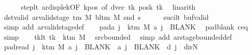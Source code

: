 \begin{isabellebody}
\ \ \ \ \isamarkupfalse%
\ step{\isacharunderscore}{\kern0pt}lt\ ar{\isacharunderscore}{\kern0pt}disp{\isacharunderscore}{\kern0pt}le{\isacharunderscore}{\kern0pt}{}k{\isacharbrackleft}{\kern0pt}OF\ kpos{\isacharcomma}{\kern0pt}\ of\ {\isachardoublequoteopen}dvec\ tk{\isachardoublequoteclose}\ {\isachardoublequoteopen}posk\ tk{\isachardoublequoteclose}{\isacharbrackright}{\kern0pt}\ \isamarkupfalse%
\ linarith\isanewline
\ \ \isamarkupfalse%
\ dst{\isacharunderscore}{\kern0pt}valid{\isacharcolon}{\kern0pt}\ {\isachardoublequoteopen}ar{\isacharunderscore}{\kern0pt}valid{\isacharunderscore}{\kern0pt}stage\ {\isacharparenleft}{\kern0pt}{\isasymGamma}{\isacharunderscore}{\kern0pt}tm\ M{\isacharparenright}{\kern0pt}\ {\isacharparenleft}{\kern0pt}bl{\isacharunderscore}{\kern0pt}tm\ M{\isacharparenright}{\kern0pt}\ {\isacharparenleft}{\kern0pt}snd\ {\isacharquery}{\kern0pt}s{\isacharprime}{\kern0pt}{\isacharparenright}{\kern0pt}{\isachardoublequoteclose}\isanewline
\ \ \ \ \isamarkupfalse%
\ suc{\isacharunderscore}{\kern0pt}i{\isacharunderscore}{\kern0pt}lt\ buf{\isacharunderscore}{\kern0pt}valid\ \isamarkupfalse%
\ {\isacharparenleft}{\kern0pt}simp\ add{\isacharcolon}{\kern0pt}\ ar{\isacharunderscore}{\kern0pt}valid{\isacharunderscore}{\kern0pt}stage{\isacharunderscore}{\kern0pt}def{\isacharparenright}{\kern0pt}\isanewline
\ \ \isamarkupfalse%
\ pad{\isacharunderscore}{\kern0pt}a{\isacharcolon}{\kern0pt}\ {\isachardoublequoteopen}{\isasymforall}j\ {\isasymge}\ k{\isacharunderscore}{\kern0pt}tm\ M{\isachardot}{\kern0pt}\ {\isacharquery}{\kern0pt}a\ j\ {\isacharequal}{\kern0pt}\ BLANK{}{\isachardoublequoteclose}\ \isamarkupfalse%
\ pad{\isacharunderscore}{\kern0pt}blank\ c{\isacharprime}{\kern0pt}{\isacharunderscore}{\kern0pt}eq\ \isamarkupfalse%
\ simp\isanewline
\ \ \isamarkupfalse%
\ tk{\isacharunderscore}{\kern0pt}lt{\isacharcolon}{\kern0pt}\ {\isachardoublequoteopen}tk\ {\isacharless}{\kern0pt}\ k{\isacharunderscore}{\kern0pt}tm\ M{\isachardoublequoteclose}\ \isamarkupfalse%
\ src{\isacharunderscore}{\kern0pt}bounded\ \isamarkupfalse%
\ {\isacharparenleft}{\kern0pt}simp\ add{\isacharcolon}{\kern0pt}\ ar{\isacharunderscore}{\kern0pt}stage{\isacharunderscore}{\kern0pt}bounded{\isacharunderscore}{\kern0pt}def{\isacharparenright}{\kern0pt}\isanewline
\ \ \isamarkupfalse%
\ pad{\isacharunderscore}{\kern0pt}read{\isacharcolon}{\kern0pt}\ {\isachardoublequoteopen}{\isasymforall}j\ {\isasymge}\ k{\isacharunderscore}{\kern0pt}tm\ M{\isachardot}{\kern0pt}\ {\isacharquery}{\kern0pt}a\ j\ {\isacharequal}{\kern0pt}\ BLANK{}\ {\isasymand}\ {\isacharquery}{\kern0pt}a\ j\ {\isacharequal}{\kern0pt}\ BLANK{}\ {\isasymand}\ {\isacharquery}{\kern0pt}d\ j\ {\isacharequal}{\kern0pt}\ dir{\isachardot}{\kern0pt}N{\isachardoublequoteclose}\isanewline

\end{isabellebody}
